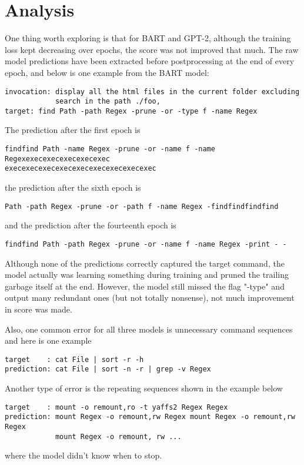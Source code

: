 \documentclass{article}
\begin{document}
\section{Analysis}
One thing worth exploring is that for BART and GPT-2, although the training loss kept decreasing over epochs, the score was not improved that much. The raw model predictions have been extracted before postprocessing at the end of every epoch, and below is one example from the BART model:
\begin{verbatim}
invocation: display all the html files in the current folder excluding 
            search in the path ./foo,
target: find Path -path Regex -prune -or -type f -name Regex
\end{verbatim}
The prediction after the first epoch is
\begin{verbatim}
findfind Path -name Regex -prune -or -name f -name Regexexecexecexecexecexec
execexecexecexecexecexecexecexecexec
\end{verbatim}
the prediction after the sixth epoch is
\begin{verbatim}
Path -path Regex -prune -or -path f -name Regex -findfindfindfind
\end{verbatim}
and the prediction after the fourteenth epoch is
\begin{verbatim}
findfind Path -path Regex -prune -or -name f -name Regex -print - -
\end{verbatim}
Although none of the predictions correctly captured the target command, the model actually was learning something during training and pruned the trailing garbage itself at the end. However, the model still missed the flag "-type" and output many redundant ones (but not totally nonsense), not much improvement in score was made.

Also, one common error for all three models is unnecessary command sequences and here is one example
\begin{verbatim}
target    : cat File | sort -r -h 
prediction: cat File | sort -n -r | grep -v Regex
\end{verbatim}
Another type of error is the repeating sequences shown in the example below
\begin{verbatim}
target    : mount -o remount,ro -t yaffs2 Regex Regex 
prediction: mount Regex -o remount,rw Regex mount Regex -o remount,rw Regex 
            mount Regex -o remount, rw ...
\end{verbatim}
where the model didn't know when to stop.
\end{document}

